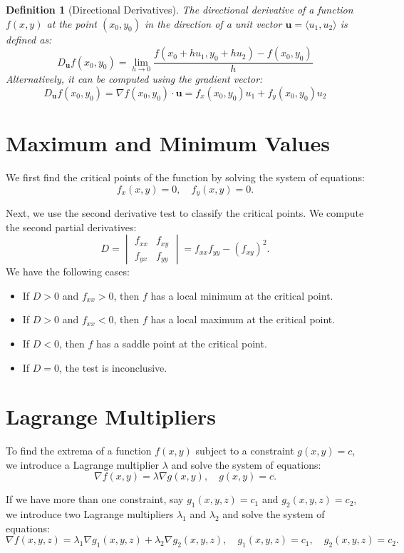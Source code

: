 \documentclass{book}
\newtheorem{definition}{Definition}[chapter]
\theoremstyle{remark}
\begin{document}
\begin{definition}[Directional Derivatives]
    The directional derivative of a function $f(x, y)$ at the point $(x_0, y_0)$ in the direction of a unit vector $\mathbf{u} = \langle u_1, u_2 \rangle$ is defined as:
    \[
        D_{\mathbf{u}} f(x_0, y_0) = \lim_{h \to 0} \frac{f(x_0 + hu_1, y_0 + hu_2) - f(x_0, y_0)}{h}
    \]
    Alternatively, it can be computed using the gradient vector:
    \[
        D_{\mathbf{u}} f(x_0, y_0) = \nabla f(x_0, y_0) \cdot \mathbf{u} = f_x(x_0, y_0) u_1 + f_y(x_0, y_0) u_2
    \]
\end{definition}

\section{Maximum and Minimum Values}

We first find the critical points of the function by solving the system of equations:
\[
    f_x(x, y) = 0, \quad f_y(x, y) = 0.
\]

Next, we use the second derivative test to classify the critical points. We compute the second partial derivatives:
\[
    D = \begin{vmatrix}
        f_{xx} & f_{xy} \\
        f_{yx} & f_{yy}
    \end{vmatrix}
    = f_{xx} f_{yy} - (f_{xy})^2.
\]
We have the following cases:
\begin{itemize}
    \item If $D > 0$ and $f_{xx} > 0$, then $f$ has a local minimum at the critical point.
    \item If $D > 0$ and $f_{xx} < 0$, then $f$ has a local maximum at the critical point.
    \item If $D < 0$, then $f$ has a saddle point at the critical point.
    \item If $D = 0$, the test is inconclusive.
\end{itemize}

\section{Lagrange Multipliers}

To find the extrema of a function $f(x, y)$ subject to a constraint $g(x, y) = c$, we introduce a Lagrange multiplier $\lambda$ and solve the system of equations:
\[
    \nabla f(x, y) = \lambda \nabla g(x, y), \quad g(x, y) = c.
\]

If we have more than one constraint, say $g_1(x, y, z) = c_1$ and $g_2(x, y, z) = c_2$, we introduce two Lagrange multipliers $\lambda_1$ and $\lambda_2$ and solve the system of equations:
\[
    \nabla f(x, y, z) = \lambda_1 \nabla g_1(x, y, z) + \lambda_2 \nabla g_2(x, y, z), \quad g_1(x, y, z) = c_1, \quad g_2(x, y, z) = c_2.
\]
\end{document}
